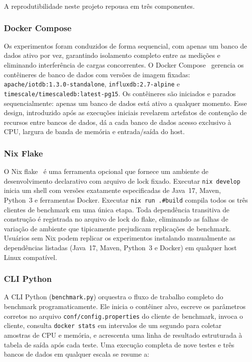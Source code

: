 A reprodutibilidade neste projeto repousa em três componentes.

\subsubsection{Docker Compose}

Os experimentos foram conduzidos de forma sequencial, com apenas um banco de dados ativo
por vez, garantindo isolamento completo entre as medições e eliminando interferência de
cargas concorrentes. O Docker Compose~\citep{docker} gerencia os contêineres de banco de
dados com versões de imagem fixadas: \texttt{apache/iotdb:1.3.0-standalone},
\texttt{influxdb:2.7-alpine} e \texttt{timescale/timescaledb:latest-pg15}. Os contêineres
são iniciados e parados sequencialmente: apenas um banco de dados está ativo a qualquer
momento. Esse design, introduzido após as execuções iniciais revelarem artefatos de
contenção de recursos entre bancos de dados, dá a cada banco de dados acesso exclusivo à
CPU, largura de banda de memória e entrada/saída do host.

\subsubsection{Nix Flake}

O Nix flake~\citep{nixos} é uma ferramenta opcional que fornece um ambiente de
desenvolvimento declarativo com arquivo de lock fixado. Executar \texttt{nix~develop} inicia
um shell com versões exatamente especificadas de Java~17, Maven, Python~3 e ferramentas Docker.
Executar \texttt{nix~run~.\#build} compila todos os três clientes de benchmark em uma única
etapa. Toda dependência transitiva de construção é registrada no arquivo de lock do flake,
eliminando as falhas de variação de ambiente que tipicamente prejudicam replicações de benchmark.
Usuários sem Nix podem replicar os experimentos instalando manualmente as dependências listadas
(Java~17, Maven, Python~3 e Docker) em qualquer host Linux compatível.

\subsubsection{CLI Python}

A CLI Python (\texttt{benchmark.py}) orquestra o fluxo de trabalho completo do benchmark
programaticamente. Ele inicia o contêiner alvo, escreve os parâmetros corretos no arquivo
\texttt{conf/config.properties} do cliente de benchmark, invoca o cliente, consulta
\texttt{docker~stats} em intervalos de um segundo para coletar amostras de CPU e memória, e
acrescenta uma linha de resultado estruturada à tabela de saída após cada teste. Uma execução
completa de nove testes e três bancos de dados em qualquer escala se resume a:

